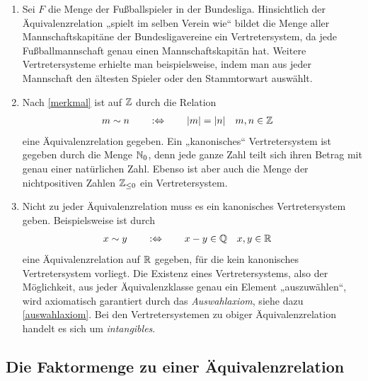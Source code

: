 \begin{bsp}[*] \quad
    \begin{enumerate}
        \item Sei $F$ die Menge der Fußballspieler in der Bundesliga. Hinsichtlich der Äquivalenzrelation „spielt im selben Verein wie“ bildet die Menge aller Mannschaftskapitäne der Bundesligavereine ein Vertretersystem, da jede Fußballmannschaft genau einen Mannschaftskapitän hat. Weitere Vertretersysteme erhielte man beispielsweise, indem man aus jeder Mannschaft den ältesten Spieler oder den Stammtorwart auswählt.
        \item Nach \cref{merkmal} ist auf $\mathbb Z$ durch die Relation
        \begin{align*}
            m\sim n\qquad&:\Leftrightarrow\qquad \vert m\vert=\vert n\vert && m,n\in \mathbb Z
        \end{align*}
        eine Äquivalenzrelation gegeben. Ein „kanonisches“ Vertretersystem ist gegeben durch die Menge $\mathbb N_0$, denn jede ganze Zahl teilt sich ihren Betrag mit genau einer natürlichen Zahl. Ebenso ist aber auch die Menge der nichtpositiven Zahlen $\mathbb Z_{\le 0}$ ein Vertretersystem.
        \item Nicht zu jeder Äquivalenzrelation muss es ein kanonisches Vertretersystem geben. Beispielsweise ist durch
        \begin{align*}
            x\sim y \qquad&:\Leftrightarrow\qquad x-y\in \mathbb Q && x,y\in \mathbb R
        \end{align*}
        eine Äquivalenzrelation auf $\mathbb R$ gegeben, für die kein kanonisches Vertretersystem vorliegt. Die Existenz eines Vertretersystems, also der Möglichkeit, aus jeder Äquivalenzklasse genau ein Element „auszuwählen“, wird axiomatisch garantiert durch das \emph{Auswahlaxiom}, siehe dazu \cref{auswahlaxiom}. Bei den Vertretersystemen zu obiger Äquivalenzrelation handelt es sich um \emph{intangibles}.
    \end{enumerate}
\end{bsp}





\subsection*{Die Faktormenge zu einer Äquivalenzrelation}


